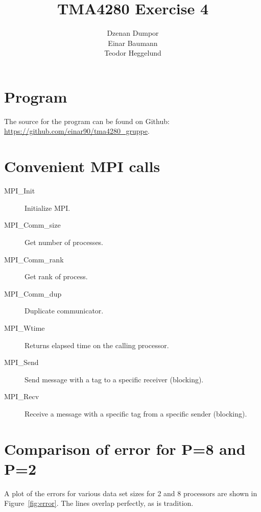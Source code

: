 

\usepackage{url}

\author{Dzenan Dumpor \\ Einar Baumann \\ Teodor Heggelund}
\title{TMA4280 Exercise 4}

\maketitle

\clearpage
\section{Program} %
\label{sec:program}
The source for the program can be found on Github: \url{https://github.com/einar90/tma4280_gruppe}.


\clearpage
\section{Convenient MPI calls} %
\label{sec:convenient_mpi_calls}
\begin{description}
  \item[MPI\_Init] Initialize MPI.
  \item[MPI\_Comm\_size] Get number of processes.
  \item[MPI\_Comm\_rank] Get rank of process.
  \item[MPI\_Comm\_dup] Duplicate communicator.
  \item[MPI\_Wtime] Returns elapsed time on the calling processor.
  \item[MPI\_Send] Send message with a tag to a specific receiver (blocking).
  \item[MPI\_Recv] Receive a message with a specific tag from a specific sender (blocking).
\end{description}


\section{Comparison of error for P=8 and P=2} %
\label{sec:comparison_of_error_for_p_8_and_p_2}
A plot of the errors for various data set sizes for 2 and 8 processors are shown in Figure~\ref{fig:error}. The lines overlap perfectly, as is tradition.

